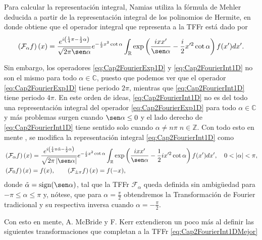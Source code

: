         Para calcular la representación integral, Namias utiliza la fórmula de Mehler \citep{morse19781953methods} deducida a partir de la representación integral de los polinomios de Hermite, en donde obtiene que el operador integral que representa a la TFFr está dado por
        \begin{equation}\label{eq:Cap2FourierInt1D}
            \left( \mathcal{F}_\alpha f \right)(x) = \frac{ e^{i\left(\frac{1}{4}\pi - \frac{1}{2}\alpha \right)} }{\sqrt{2\pi \sen\alpha}} e^{-\frac{i}{2}x^2 \cot\alpha}\int_{\mathbb{R}}\exp\left(  \frac{ixx'}{\sen\alpha } - \frac{i}{2}x'^2 \cot\alpha \right)f(x')dx'.
        \end{equation}

        Sin embargo, los operadores \ref{eq:Cap2FourierExp1D} y \ref{eq:Cap2FourierInt1D} no son el mismo para todo $\alpha \in \mathbb{C}$, puesto que podemos ver que el operador \ref{eq:Cap2FourierExp1D} tiene periodo $2\pi$, mientras que \ref{eq:Cap2FourierInt1D} tiene periodo $4\pi$. En este orden de ideas, \ref{eq:Cap2FourierInt1D} no es del todo una representación integral del operador \ref{eq:Cap2FourierExp1D} para todo $\alpha \in \mathbb{C}$ y más problemas surgen cuando $\sen \alpha \leq 0 $ y el lado derecho de \ref{eq:Cap2FourierInt1D} tiene sentido solo cuando $\alpha \neq n\pi\; n\in \mathbb{Z}$. Con todo esto en mente \citep{mcbride1987namias}, se modifica la representación integral \ref{eq:Cap2FourierInt1D} como
        \begin{align}
            & \left( \mathcal{F}_\alpha f \right)(x) = \frac{e^{i\left(\frac{1}{4}\pi \tilde{\alpha} - \frac{1}{2}\alpha \right)} }{\sqrt{ 2\pi \left|\sen\alpha \right| }}e^{-\frac{i}{2}x^2\cot\alpha}\int_{\mathbb{R}}\exp\left(\frac{ixx'}{\sen\alpha} - \frac{1}{2}ix'^2\cot\alpha\right)f(x')dx', \quad 0 < |\alpha| < \pi,\label{eq:Cap2FourierInt1DMejor}\\
            & \left(\mathcal{F}_0 f\right)(x) = f(x), \qquad  \left(\mathcal{F}_{\pm\pi} f\right)(x) = f(-x),
        \end{align}
        donde $\tilde{\alpha} = \operatorname{sign}(\sen\alpha)$, tal que la TFFr $\mathcal{F}_\alpha$ queda definida sin ambigüedad para $-\pi \leq \alpha \leq \pi$ y, nótese, que para $\alpha = \frac{\pi}{2}$ obtendremos la Transformación de Fourier tradicional y su respectiva inversa cuando $\alpha = - \frac{\pi}{2}$.

        Con esto en mente, A. McBride y F. Kerr extendieron un poco más al definir las siguientes transformaciones que completan a la TFFr \ref{eq:Cap2FourierInt1DMejor}
        
